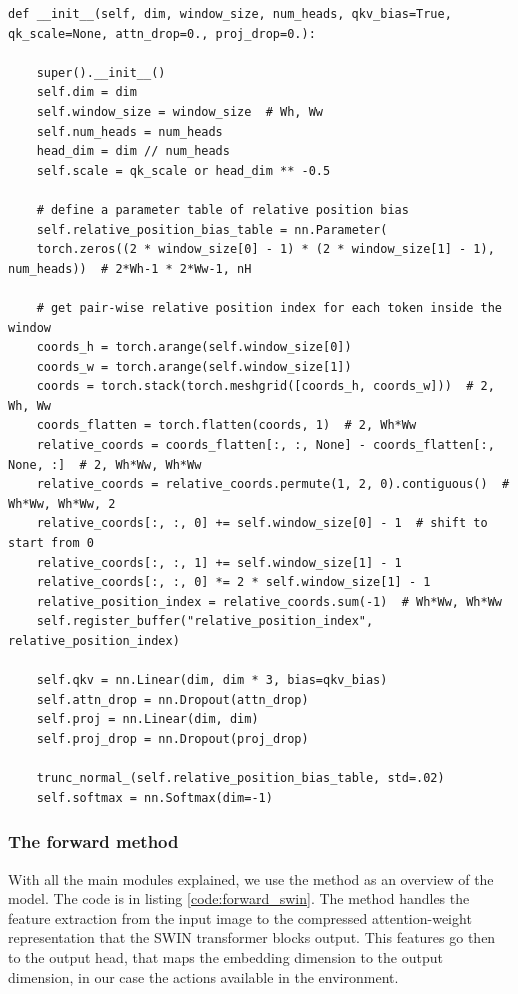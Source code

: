 \begin{lstlisting}[caption={Window attention module constructor}, label={code:win_attention_constructor}]
def __init__(self, dim, window_size, num_heads, qkv_bias=True, qk_scale=None, attn_drop=0., proj_drop=0.):
	
	super().__init__()
	self.dim = dim
	self.window_size = window_size  # Wh, Ww
	self.num_heads = num_heads
	head_dim = dim // num_heads
	self.scale = qk_scale or head_dim ** -0.5
	
	# define a parameter table of relative position bias
	self.relative_position_bias_table = nn.Parameter(
	torch.zeros((2 * window_size[0] - 1) * (2 * window_size[1] - 1), num_heads))  # 2*Wh-1 * 2*Ww-1, nH
	
	# get pair-wise relative position index for each token inside the window
	coords_h = torch.arange(self.window_size[0])
	coords_w = torch.arange(self.window_size[1])
	coords = torch.stack(torch.meshgrid([coords_h, coords_w]))  # 2, Wh, Ww
	coords_flatten = torch.flatten(coords, 1)  # 2, Wh*Ww
	relative_coords = coords_flatten[:, :, None] - coords_flatten[:, None, :]  # 2, Wh*Ww, Wh*Ww
	relative_coords = relative_coords.permute(1, 2, 0).contiguous()  # Wh*Ww, Wh*Ww, 2
	relative_coords[:, :, 0] += self.window_size[0] - 1  # shift to start from 0
	relative_coords[:, :, 1] += self.window_size[1] - 1
	relative_coords[:, :, 0] *= 2 * self.window_size[1] - 1
	relative_position_index = relative_coords.sum(-1)  # Wh*Ww, Wh*Ww
	self.register_buffer("relative_position_index", relative_position_index)
	
	self.qkv = nn.Linear(dim, dim * 3, bias=qkv_bias)
	self.attn_drop = nn.Dropout(attn_drop)
	self.proj = nn.Linear(dim, dim)
	self.proj_drop = nn.Dropout(proj_drop)
	
	trunc_normal_(self.relative_position_bias_table, std=.02)
	self.softmax = nn.Softmax(dim=-1)
\end{lstlisting}

\subsubsection{The forward method}

With all the main modules explained, we use the  method as an overview of the model. The code is in listing \ref{code:forward_swin}. The  method handles the feature extraction from the input image to the compressed attention-weight representation that the SWIN transformer blocks output. This features go then to the output head, that maps the embedding dimension to the output dimension, in our case the actions available in the environment.

